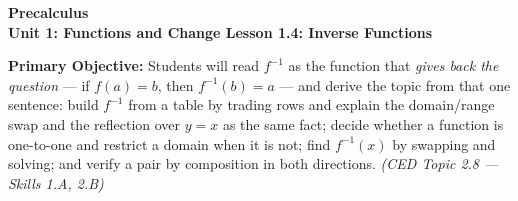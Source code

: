 \documentclass[10pt]{article}
\newcommand{\CourseName}{Precalculus}
\newcommand{\UnitNumberName}{Unit 1: Functions and Change \quad}
\newcommand{\LessonNumberName}{Lesson 1.4: Inverse Functions}
\begin{document}
\begin{center}
    {\Large\bfseries \CourseName \\
    {\small\bfseries \UnitNumberName \LessonNumberName}}
\end{center}

\begin{tcolorbox}[colback=lilac, colframe=plum, boxrule=0.9pt, arc=2mm,
    left=2mm, right=2mm, top=1.5mm, bottom=1.5mm]
    \textbf{Primary Objective:} Students will read $f^{-1}$ as the function that
    \textit{gives back the question} --- if $f(a) = b$, then $f^{-1}(b) = a$ ---
    and derive the topic from that one sentence: build $f^{-1}$ from a table by
    trading rows and explain the domain/range swap and the reflection over
    $y = x$ as the same fact; decide whether a function is one-to-one and
    restrict a domain when it is not; find $f^{-1}(x)$ by swapping and solving;
    and verify a pair by composition in both directions.
    \hfill\textit{\small (CED Topic 2.8 --- Skills 1.A, 2.B)}
\end{tcolorbox}
\end{document}

